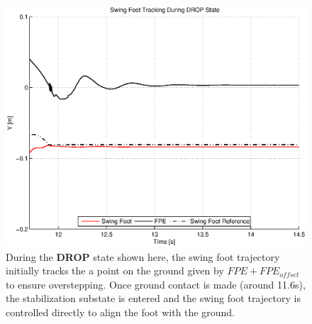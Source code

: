 \begin{figure}[!h]
	\centering
    \includegraphics[scale=0.5]{fig/ch4/fpetrack.eps}
  	\caption{During the \textbf{DROP} state shown here, the swing foot trajectory initially tracks the a point on the ground given by $FPE + FPE_{offset}$ to ensure overstepping. Once ground contact is made (around 11.6s), the stabilization substate is entered and the swing foot trajectory is controlled directly to align the foot with the ground.}
	\label{fig:fpetrack}
\end{figure}




